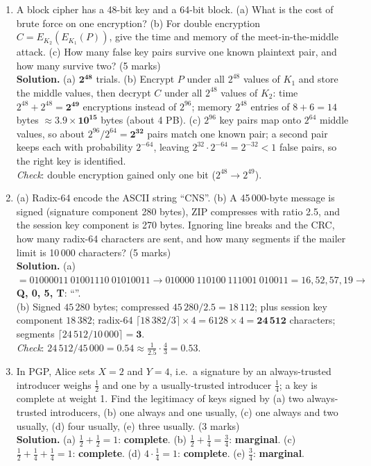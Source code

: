 \begin{enumerate}[leftmargin=1.6em,itemsep=4pt]
  \item A block cipher has a 48-bit key and a 64-bit block. (a) What is the cost of brute force on one encryption? (b) For double encryption $C = E_{K_2}(E_{K_1}(P))$, give the time and memory of the meet-in-the-middle attack. (c) How many false key pairs survive one known plaintext pair, and how many survive two? \hfill (5 marks)\\
  \textbf{Solution.} (a) $\mathbf{2^{48}}$ trials. (b) Encrypt $P$ under all $2^{48}$ values of $K_1$ and store the middle values, then decrypt $C$ under all $2^{48}$ values of $K_2$: time $2^{48} + 2^{48} = \mathbf{2^{49}}$ encryptions instead of $2^{96}$; memory $2^{48}$ entries of $8 + 6 = 14$ bytes $\approx \mathbf{3.9 \times 10^{15}}$ bytes (about 4 PB). (c) $2^{96}$ key pairs map onto $2^{64}$ middle values, so about $2^{96}/2^{64} = \mathbf{2^{32}}$ pairs match one known pair; a second pair keeps each with probability $2^{-64}$, leaving $2^{32} \cdot 2^{-64} = 2^{-32} < 1$ false pairs, so the right key is identified.\\
  \emph{Check}: double encryption gained only one bit ($2^{48} \to 2^{49}$).

  \item (a) Radix-64 encode the ASCII string ``CNS''. (b) A 45\,000-byte message is signed (signature component 280 bytes), ZIP compresses with ratio 2.5, and the session key component is 270 bytes. Ignoring line breaks and the CRC, how many radix-64 characters are sent, and how many segments if the mailer limit is 10\,000 characters? \hfill (5 marks)\\
  \textbf{Solution.} (a)  $= 01000011\ 01001110\ 01010011 \to 010000\ 110100\ 111001\ 010011 = 16, 52, 57, 19 \to$ \textbf{Q, 0, 5, T}: ``''.\\
  (b) Signed $45\,280$ bytes; compressed $45\,280/2.5 = 18\,112$; plus session key component $18\,382$; radix-64 $\lceil 18\,382/3 \rceil \times 4 = 6128 \times 4 = \mathbf{24\,512}$ characters; segments $\lceil 24\,512/10\,000 \rceil = \mathbf{3}$.\\
  \emph{Check}: $24\,512/45\,000 = 0.54 \approx \frac{1}{2.5} \cdot \frac43 = 0.53$.

  \item In PGP, Alice sets $X = 2$ and $Y = 4$, i.e.\ a signature by an always-trusted introducer weighs $\frac12$ and one by a usually-trusted introducer $\frac14$; a key is complete at weight 1. Find the legitimacy of keys signed by (a) two always-trusted introducers, (b) one always and one usually, (c) one always and two usually, (d) four usually, (e) three usually. \hfill (3 marks)\\
  \textbf{Solution.} (a) $\frac12 + \frac12 = 1$: \textbf{complete}. (b) $\frac12 + \frac14 = \frac34$: \textbf{marginal}. (c) $\frac12 + \frac14 + \frac14 = 1$: \textbf{complete}. (d) $4 \cdot \frac14 = 1$: \textbf{complete}. (e) $\frac34$: \textbf{marginal}.


\end{enumerate}
